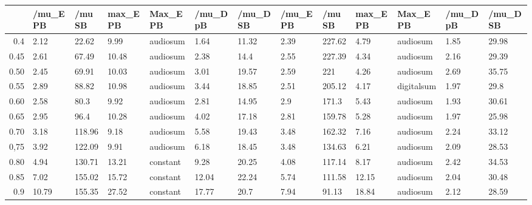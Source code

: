 \begin{table}[ht]
\centering
\begin{tabular}{rllllllllllll}
  \hline
 & /mu\_E PB & /mu SB & max\_E PB & Max\_E PB & /mu\_D pB & /mu\_D SB & /mu\_E PB & /mu SB & max\_E PB & Max\_E PB & /mu\_D pB & /mu\_D SB \\ 
  \hline
0.4 & 2.12 & 22.62 & 9.99 & audiosum & 1.64 & 11.32 & 2.39 & 227.62 & 4.79 & audiosum & 1.85 & 29.98 \\ 
  0.45 & 2.61 & 67.49 & 10.48 & audiosum & 2.38 & 14.4 & 2.55 & 227.39 & 4.34 & audiosum & 2.16 & 29.39 \\ 
  0.50 & 2.45 & 69.91 & 10.03 & audiosum & 3.01 & 19.57 & 2.59 & 221 & 4.26 & audiosum & 2.69 & 35.75 \\ 
  0.55 & 2.89 & 88.82 & 10.98 & audiosum & 3.44 & 18.85 & 2.51 & 205.12 & 4.17 & digitalsum & 1.97 & 29.8 \\ 
  0.60 & 2.58 & 80.3 & 9.92 & audiosum & 2.81 & 14.95 & 2.9 & 171.3 & 5.43 & audiosum & 1.93 & 30.61 \\ 
  0.65 & 2.95 & 96.4 & 10.28 & audiosum & 4.02 & 17.18 & 2.81 & 159.78 & 5.28 & audiosum & 1.97 & 25.98 \\ 
  0.70 & 3.18 & 118.96 & 9.18 & audiosum & 5.58 & 19.43 & 3.48 & 162.32 & 7.16 & audiosum & 2.24 & 33.12 \\ 
  0,75 & 3.92 & 122.09 & 9.91 & audiosum & 6.18 & 18.45 & 3.48 & 134.63 & 6.21 & audiosum & 2.09 & 28.53 \\ 
  0.80 & 4.94 & 130.71 & 13.21 & constant & 9.28 & 20.25 & 4.08 & 117.14 & 8.17 & audiosum & 2.42 & 34.53 \\ 
  0.85 & 7.02 & 155.02 & 15.72 & constant & 12.04 & 22.24 & 5.74 & 111.58 & 12.15 & audiosum & 2.04 & 30.48 \\ 
  0.9 & 10.79 & 155.35 & 27.52 & constant & 17.77 & 20.7 & 7.94 & 91.13 & 18.84 & audiosum & 2.12 & 28.59 \\ 
   \hline
\end{tabular}
\end{table}
